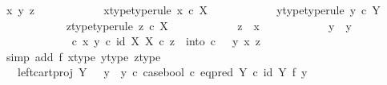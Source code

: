 \begin{isabellebody}
\ x\ y\ z\isanewline
\ \ \ \ \ \ \ \ \ \ \isamarkupfalse%
\ x{\isacharunderscore}{\kern0pt}type{\isacharbrackleft}{\kern0pt}type{\isacharunderscore}{\kern0pt}rule{\isacharbrackright}{\kern0pt}{\isacharcolon}{\kern0pt}\ {\isachardoublequoteopen}x\ {\isasymin}\isactrlsub c\ X{\isachardoublequoteclose}\isanewline
\ \ \ \ \ \ \ \ \ \ \isamarkupfalse%
\ y{\isacharunderscore}{\kern0pt}type{\isacharbrackleft}{\kern0pt}type{\isacharunderscore}{\kern0pt}rule{\isacharbrackright}{\kern0pt}{\isacharcolon}{\kern0pt}\ {\isachardoublequoteopen}y\ {\isasymin}\isactrlsub c\ Y{\isachardoublequoteclose}\isanewline
\ \ \ \ \ \ \ \ \ \ \isamarkupfalse%
\ z{\isacharunderscore}{\kern0pt}type{\isacharbrackleft}{\kern0pt}type{\isacharunderscore}{\kern0pt}rule{\isacharbrackright}{\kern0pt}{\isacharcolon}{\kern0pt}\ {\isachardoublequoteopen}z\ {\isasymin}\isactrlsub c\ X{\isachardoublequoteclose}\isanewline
\ \ \ \ \ \ \ \ \ \ \isamarkupfalse%
\ {\isachardoublequoteopen}z\ {\isasymnoteq}\ x{\isachardoublequoteclose}\isanewline
\ \ \ \ \ \ \ \ \ \ \isamarkupfalse%
\ {\isachardoublequoteopen}y\ {\isasymnoteq}\ y{}{\isachardoublequoteclose}\isanewline
\ \ \ \ \ \ \ \ \ \ \isamarkupfalse%
\ {\isachardoublequoteopen}{\isacharparenleft}{\kern0pt}{\isasymTheta}\ {\isasymcirc}\isactrlsub c\ {\isasymlangle}x{\isacharcomma}{\kern0pt}\ y{\isasymrangle}{\isacharparenright}{\kern0pt}\isactrlsup {\isasymflat}\ {\isasymcirc}\isactrlsub c\ {\isasymlangle}id\ X{\isacharcomma}{\kern0pt}\ {\isasymbeta}\isactrlbsub X\isactrlesub {\isasymrangle}\ {\isasymcirc}\isactrlsub c\ z\ {\isacharequal}{\kern0pt}\ into\ {\isasymcirc}\isactrlsub c\ \ \ {\isasymlangle}y{\isacharcomma}{\kern0pt}\ {\isasymlangle}x{\isacharcomma}{\kern0pt}\ z{\isasymrangle}{\isasymrangle}{\isachardoublequoteclose}\isanewline
\ \ \ \ \ \ \ \ \ \ \ \ \isamarkupfalse%
\ {\isacharparenleft}{\kern0pt}simp\ add{\isacharcolon}{\kern0pt}\ f{}\ x{\isacharunderscore}{\kern0pt}type\ y{\isacharunderscore}{\kern0pt}type\ z{\isacharunderscore}{\kern0pt}type{\isacharparenright}{\kern0pt}\isanewline
\ \ \ \ \ \ \ \ \ \ \isamarkupfalse%
\ \isamarkupfalse%
\ {\isachardoublequoteopen}{\isachardot}{\kern0pt}{\isachardot}{\kern0pt}{\isachardot}{\kern0pt}\ {\isacharequal}{\kern0pt}\ {\isacharparenleft}{\kern0pt}left{\isacharunderscore}{\kern0pt}cart{\isacharunderscore}{\kern0pt}proj\ Y\ {\isasymone}\ {\isasymamalg}\ {\isacharparenleft}{\kern0pt}{\isacharparenleft}{\kern0pt}y{}\ {\isasymamalg}\ y{}{\isacharparenright}{\kern0pt}\ {\isasymcirc}\isactrlsub c\ case{\isacharunderscore}{\kern0pt}bool\ {\isasymcirc}\isactrlsub c\ eq{\isacharunderscore}{\kern0pt}pred\ Y\ {\isasymcirc}\isactrlsub c\ {\isacharparenleft}{\kern0pt}id\ Y\ {\isasymtimes}\isactrlsub f\ y{}{\isacharparenright}{\kern0pt}{\isacharparenright}{\kern0pt}{\isacharparenright}{\kern0pt}\isanewline

\end{isabellebody}
